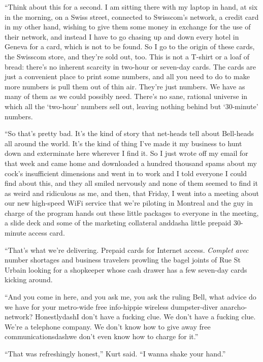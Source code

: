 ``Think about this for a second.  I am sitting there with my laptop in
hand, at six in the morning, on a Swiss street, connected to
Swisscom's network, a credit card in my other hand, wishing to give
them some money in exchange for the use of their network, and instead
I have to go chasing up and down every hotel in Geneva for a card,
which is not to be found.  So I go to the origin of these cards, the
Swisscom store, and they're sold out, too.  This is not a T-shirt or a
loaf of bread:  there's no inherent scarcity in two-hour or seven-day
cards.  The cards are just a convenient place to print some numbers,
and all you need to do to make more numbers is pull them out of thin
air.  They're just numbers.  We have as many of them as we could
possibly need.  There's no sane, rational universe in which all the
`two-hour' numbers sell out, leaving nothing behind but `30-minute'
numbers.

``So that's pretty bad.  It's the kind of story that net-heads tell
about Bell-heads all around the world.  It's the kind of thing I've
made it my business to hunt down and exterminate here wherever I find
it.  So I just wrote off my email for that week and came home and
downloaded a hundred thousand spams about my cock's insufficient
dimensions and went in to work and I told everyone I could find about
this, and they all smiled nervously and none of them seemed to find it
as weird and ridiculous as me, and then, that Friday, I went into a
meeting about our new high-speed WiFi service that we're piloting in
Montreal and the guy in charge of the program hands out these little
packages to everyone in the meeting, a slide deck and some of the
marketing collateral anddash{}a little prepaid 30-minute access card.

``That's what we're delivering.  Prepaid cards for Internet access. 
\textit{Complet avec} number shortages and business travelers prowling
the bagel joints of Rue St Urbain looking for a shopkeeper whose cash
drawer has a few seven-day cards kicking around.

``And you come in here, and you ask me, you ask the ruling Bell, what
advice do we have for your metro-wide free info-hippie wireless
dumpster-diver anarcho-network?  Honestlydash{}I don't have a fucking
clue.  We don't have a fucking clue.  We're a telephone company.  We
don't know how to give away free communicationsdash{}we don't even know
how to charge for it.''

``That was refreshingly honest,'' Kurt said.  ``I wanna shake your
hand.''

